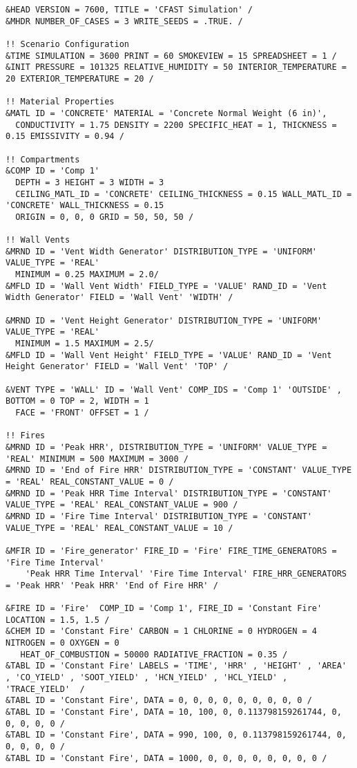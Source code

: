 \begin{lstlisting}[basicstyle=\tiny]
&HEAD VERSION = 7600, TITLE = 'CFAST Simulation' /
&MHDR NUMBER_OF_CASES = 3 WRITE_SEEDS = .TRUE. /

!! Scenario Configuration
&TIME SIMULATION = 3600 PRINT = 60 SMOKEVIEW = 15 SPREADSHEET = 1 /
&INIT PRESSURE = 101325 RELATIVE_HUMIDITY = 50 INTERIOR_TEMPERATURE = 20 EXTERIOR_TEMPERATURE = 20 /

!! Material Properties
&MATL ID = 'CONCRETE' MATERIAL = 'Concrete Normal Weight (6 in)',
  CONDUCTIVITY = 1.75 DENSITY = 2200 SPECIFIC_HEAT = 1, THICKNESS = 0.15 EMISSIVITY = 0.94 /

!! Compartments
&COMP ID = 'Comp 1'
  DEPTH = 3 HEIGHT = 3 WIDTH = 3
  CEILING_MATL_ID = 'CONCRETE' CEILING_THICKNESS = 0.15 WALL_MATL_ID = 'CONCRETE' WALL_THICKNESS = 0.15
  ORIGIN = 0, 0, 0 GRID = 50, 50, 50 /

!! Wall Vents
&MRND ID = 'Vent Width Generator' DISTRIBUTION_TYPE = 'UNIFORM' VALUE_TYPE = 'REAL'
  MINIMUM = 0.25 MAXIMUM = 2.0/
&MFLD ID = 'Wall Vent Width' FIELD_TYPE = 'VALUE' RAND_ID = 'Vent Width Generator' FIELD = 'Wall Vent' 'WIDTH' /

&MRND ID = 'Vent Height Generator' DISTRIBUTION_TYPE = 'UNIFORM' VALUE_TYPE = 'REAL'
  MINIMUM = 1.5 MAXIMUM = 2.5/
&MFLD ID = 'Wall Vent Height' FIELD_TYPE = 'VALUE' RAND_ID = 'Vent Height Generator' FIELD = 'Wall Vent' 'TOP' /

&VENT TYPE = 'WALL' ID = 'Wall Vent' COMP_IDS = 'Comp 1' 'OUTSIDE' , BOTTOM = 0 TOP = 2, WIDTH = 1
  FACE = 'FRONT' OFFSET = 1 /

!! Fires
&MRND ID = 'Peak HRR', DISTRIBUTION_TYPE = 'UNIFORM' VALUE_TYPE = 'REAL' MINIMUM = 500 MAXIMUM = 3000 /
&MRND ID = 'End of Fire HRR' DISTRIBUTION_TYPE = 'CONSTANT' VALUE_TYPE = 'REAL' REAL_CONSTANT_VALUE = 0 /
&MRND ID = 'Peak HRR Time Interval' DISTRIBUTION_TYPE = 'CONSTANT' VALUE_TYPE = 'REAL' REAL_CONSTANT_VALUE = 900 /
&MRND ID = 'Fire Time Interval' DISTRIBUTION_TYPE = 'CONSTANT' VALUE_TYPE = 'REAL' REAL_CONSTANT_VALUE = 10 /

&MFIR ID = 'Fire_generator' FIRE_ID = 'Fire' FIRE_TIME_GENERATORS = 'Fire Time Interval'
    'Peak HRR Time Interval' 'Fire Time Interval' FIRE_HRR_GENERATORS = 'Peak HRR' 'Peak HRR' 'End of Fire HRR' /

&FIRE ID = 'Fire'  COMP_ID = 'Comp 1', FIRE_ID = 'Constant Fire'  LOCATION = 1.5, 1.5 /
&CHEM ID = 'Constant Fire' CARBON = 1 CHLORINE = 0 HYDROGEN = 4 NITROGEN = 0 OXYGEN = 0
   HEAT_OF_COMBUSTION = 50000 RADIATIVE_FRACTION = 0.35 /
&TABL ID = 'Constant Fire' LABELS = 'TIME', 'HRR' , 'HEIGHT' , 'AREA' , 'CO_YIELD' , 'SOOT_YIELD' , 'HCN_YIELD' , 'HCL_YIELD' , 'TRACE_YIELD'  /
&TABL ID = 'Constant Fire', DATA = 0, 0, 0, 0, 0, 0, 0, 0, 0 /
&TABL ID = 'Constant Fire', DATA = 10, 100, 0, 0.113798159261744, 0, 0, 0, 0, 0 /
&TABL ID = 'Constant Fire', DATA = 990, 100, 0, 0.113798159261744, 0, 0, 0, 0, 0 /
&TABL ID = 'Constant Fire', DATA = 1000, 0, 0, 0, 0, 0, 0, 0, 0 /


\end{lstlisting}

